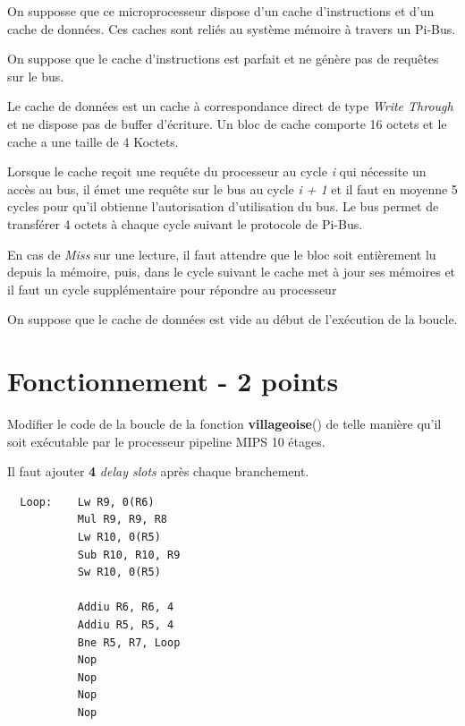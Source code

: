 {On supposse que ce microprocesseur dispose d'un cache d'instructions et d'un
cache de donn\'ees. Ces caches sont reli\'es au syst\`eme m\'emoire \`a
travers un Pi-Bus.

On suppose que le cache d'instructions est parfait et ne g\'en\`ere pas de
requ\^etes sur le bus.

Le cache de donn\'ees est un cache \`a correspondance direct de type
\textit{Write Through} et ne dispose pas de buffer d'\'ecriture. Un bloc
de cache comporte 16 octets et le cache a une taille de 4 Koctets.

Lorsque le cache re\c{c}oit une requ\^ete du processeur au cycle \textit{i}
qui n\'ecessite un acc\`es au bus, il \'emet une requ\^ete sur le bus au
cycle \textit{i + 1} et il faut en moyenne 5 cycles pour qu'il obtienne
l'autorisation d'utilisation du bus. Le bus permet de transf\'erer 4 octets
\`a chaque cycle suivant le protocole de Pi-Bus.

En cas de \textit{Miss} sur une lecture, il faut attendre que le bloc soit
enti\`erement lu depuis la m\'emoire, puis, dans le cycle suivant le cache
met \`a jour ses m\'emoires et il faut un cycle suppl\'ementaire pour
r\'epondre au processeur

On suppose que le cache de donn\'ees est vide au d\'ebut de l'ex\'ecution
de la boucle.

%
%

\section{Fonctionnement - 2 points}

Modifier le code de la boucle de la fonction \textbf{villageoise}() de telle
mani\`ere qu'il soit ex\'ecutable par le processeur pipeline MIPS 10 \'etages.

\begin{correction}

  Il faut ajouter \textbf{4} \textit{delay slots} apr\`es chaque
  branchement.

  \begin{verbatim}
  Loop:    Lw R9, 0(R6)
           Mul R9, R9, R8
           Lw R10, 0(R5)
           Sub R10, R10, R9
           Sw R10, 0(R5)

           Addiu R6, R6, 4
           Addiu R5, R5, 4
           Bne R5, R7, Loop
           Nop
           Nop
           Nop
           Nop
  \end{verbatim}

\end{correction}

}

